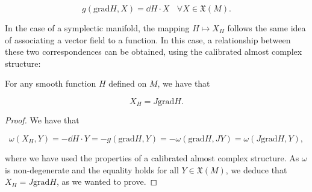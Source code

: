 $$g(\text{grad}H, X) = \dd H \cdot X \ \ \ \ \forall X \in \mathfrak{X}(M) .$$

In the case of a symplectic manifold, the mapping $H \mapsto X_H$ follows the same idea of associating a vector field to a function. In this case, a relationship between these two correspondences can be obtained, using the calibrated almost complex structure:

\begin{prop}
For any smooth function $H$ defined on $M$, we have that

$$X_H = J \text{grad}H .$$
\end{prop}

\begin{proof}
We have that

$$\omega(X_H,Y) = - \dd H \cdot Y = - g(\text{grad}H,Y) = - \omega(\text{grad}H,JY) = \omega(J \text{grad}H, Y) ,$$

where we have used the properties of a calibrated almost complex structure. As $\omega$ is non-degenerate and the equality holds for all $Y \in \mathfrak{X}(M)$, we deduce that $X_H = J \text{grad}H$, as we wanted to prove.
\end{proof}
